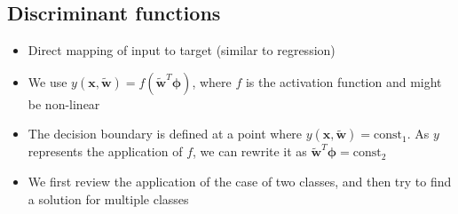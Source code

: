 \subsection{Discriminant functions}
\begin{itemize}
	\item Direct mapping of input to target (similar to regression)%
	\item We use $y\left(\bm{x},\bm{\tilde{w}}\right) = f\left(\bm{\tilde{w}}^T\bm{\phi}\right)$, where $f$ is the activation function and might be non-linear 
	\item The decision boundary is defined at a point where $y\left(\bm{x},\bm{\tilde{w}}\right) = \text{const}_1$. As $y$ represents the application of $f$, we can rewrite it as $\bm{\tilde{w}}^T\bm{\phi} = \text{const}_2$
	\item We first review the application of the case of two classes, and then try to find a solution for multiple classes
\end{itemize}
